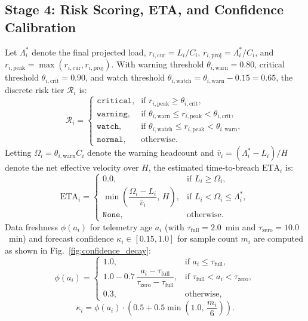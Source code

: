 \documentclass[conference,a4paper]{IEEEtran}
\begin{document}
\subsection{Stage 4: Risk Scoring, ETA, and Confidence Calibration}
Let $\Lambda_i^*$ denote the final projected load, $r_{i,\mathrm{cur}} = L_i / C_i$, $r_{i,\mathrm{proj}} = \Lambda_i^* / C_i$, and $r_{i,\mathrm{peak}} = \max(r_{i,\mathrm{cur}}, r_{i,\mathrm{proj}})$. With warning threshold $\theta_{i,\mathrm{warn}} = 0.80$, critical threshold $\theta_{i,\mathrm{crit}} = 0.90$, and watch threshold $\theta_{i,\mathrm{watch}} = \theta_{i,\mathrm{warn}} - 0.15 = 0.65$, the discrete risk tier $\mathcal{R}_i$ is:
\begin{equation}
\mathcal{R}_i = \begin{cases}
\texttt{critical}, & \text{if } r_{i,\mathrm{peak}} \ge \theta_{i,\mathrm{crit}}, \\
\texttt{warning}, & \text{if } \theta_{i,\mathrm{warn}} \le r_{i,\mathrm{peak}} < \theta_{i,\mathrm{crit}}, \\
\texttt{watch}, & \text{if } \theta_{i,\mathrm{watch}} \le r_{i,\mathrm{peak}} < \theta_{i,\mathrm{warn}}, \\
\texttt{normal}, & \text{otherwise.}
\end{cases}
\label{eq:risk_tier}
\end{equation}
Letting $\Omega_i = \theta_{i,\mathrm{warn}} C_i$ denote the warning headcount and $\bar{v}_i = (\Lambda_i^* - L_i)/H$ denote the net effective velocity over $H$, the estimated time-to-breach $\mathrm{ETA}_i$ is:
\begin{equation}
\mathrm{ETA}_i = \begin{cases}
0.0, & \text{if } L_i \ge \Omega_i, \\[3pt]
\min\!\left(\dfrac{\Omega_i - L_i}{\bar{v}_i},\, H\right), & \text{if } L_i < \Omega_i \le \Lambda_i^*, \\[5pt]
\texttt{None}, & \text{otherwise.}
\end{cases}
\label{eq:eta}
\end{equation}
Data freshness $\phi(a_i)$ for telemetry age $a_i$ (with $\tau_{\mathrm{full}} = 2.0$~min and $\tau_{\mathrm{zero}} = 10.0$~min) and forecast confidence $\kappa_i \in [0.15, 1.0]$ for sample count $m_i$ are computed as shown in Fig.~\ref{fig:confidence_decay}:
\begin{equation}
\phi(a_i) = \begin{cases}
1.0, & \text{if } a_i \le \tau_{\mathrm{full}}, \\[3pt]
1.0 - 0.7\,\dfrac{a_i - \tau_{\mathrm{full}}}{\tau_{\mathrm{zero}} - \tau_{\mathrm{full}}}, & \text{if } \tau_{\mathrm{full}} < a_i < \tau_{\mathrm{zero}}, \\[5pt]
0.3, & \text{otherwise,}
\end{cases}
\label{eq:freshness}
\end{equation}
\begin{equation}
\kappa_i = \phi(a_i) \cdot \left(0.5 + 0.5 \min\!\left(1.0,\, \frac{m_i}{6}\right)\right).
\label{eq:confidence}
\end{equation}
\end{document}
